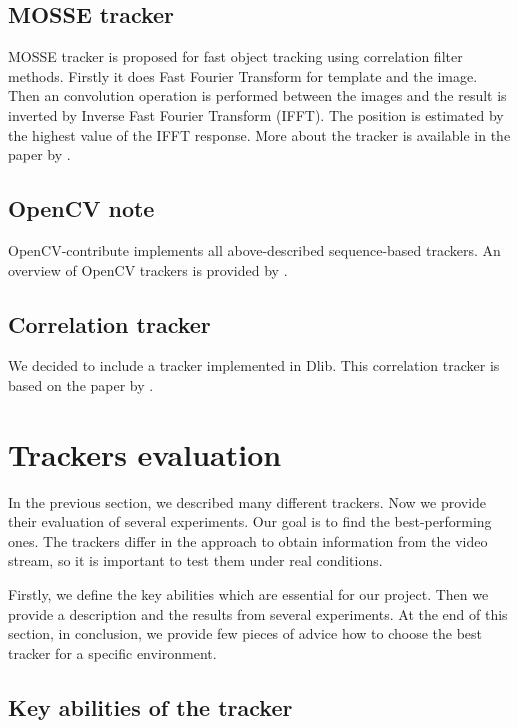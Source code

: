 \subsection*{MOSSE tracker}
MOSSE tracker is proposed for fast object tracking using correlation filter
methods. Firstly it does Fast Fourier Transform for template and the image.
Then an convolution operation is performed between the images and the result is
inverted by Inverse Fast Fourier Transform (IFFT). The position is estimated by
the highest value of the IFFT response. More about the tracker is available in
the paper by \citet*{mosse}.

\subsection*{OpenCV note}
OpenCV-contribute implements all above-described sequence-based trackers. An
overview of OpenCV trackers is provided by \citet*{opencv-trackers}.

\subsection*{Correlation tracker}
We decided to include a tracker implemented in Dlib. This
correlation tracker is based on the paper by \citet*{correlation}.


\section{Trackers evaluation}

In the previous section, we described many different trackers. Now we provide
their evaluation of several experiments. Our goal is to find the
best-performing ones. The trackers differ in the approach to obtain information
from the video stream, so it is important to test them under real conditions.

Firstly, we define the key abilities which are essential for our project. Then
we provide a description and the results from several experiments. At the end
of this section, in conclusion, we provide few pieces of advice how to choose
the best tracker for a specific environment.

\subsection*{Key abilities of the tracker}

